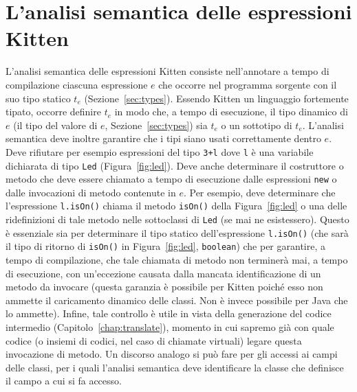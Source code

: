 \section{L'analisi semantica delle espressioni Kitten}
  \label{sec:analysis_expressions}
%
L'analisi semantica delle espressioni Kitten consiste nell'annotare a tempo
di compilazione ciascuna
espressione $e$ che occorre nel programma sorgente con il suo tipo statico
$t_e$ (Sezione~\ref{sec:types}).
Essendo Kitten un linguaggio fortemente tipato, occorre definire
$t_e$ in modo che, a tempo di esecuzione, il tipo dinamico di $e$
(\cioe il tipo del valore di $e$, Sezione~\ref{sec:types})
sia $t_e$ o un sottotipo di $t_e$.
L'analisi semantica deve inoltre garantire che i tipi siano usati correttamente
dentro $e$. Deve rifiutare per esempio espressioni del tipo
\texttt{3+l} dove \texttt{l} \`e una variabile dichiarata di tipo
\texttt{Led} (Figura~\ref{fig:led}). Deve anche determinare il costruttore o 
metodo che deve essere chiamato a tempo di esecuzione dalle espressioni
\texttt{new} o dalle invocazioni di metodo contenute in $e$. Per esempio,
deve determinare che l'espressione \texttt{l.isOn()} chiama il metodo
\texttt{isOn()} della Figura~\ref{fig:led} o una delle ridefinizioni di tale
metodo nelle sottoclassi di \texttt{Led} (se mai ne esistessero). Questo \`e
essenziale sia per determinare il tipo statico dell'espressione
\texttt{l.isOn()} (che sar\`a il tipo di ritorno di \texttt{isOn()} in
Figura~\ref{fig:led}, \cioe \texttt{boolean})
che per garantire, a tempo di compilazione, che tale chiamata di metodo
non terminer\`a mai, a tempo di esecuzione, con un'eccezione causata dalla
mancata identificazione di un metodo da invocare (questa garanzia \`e possibile
per Kitten poich\'e esso non ammette il caricamento dinamico delle classi.
Non \`e invece possibile per Java che lo ammette). Infine, tale
controllo \`e utile in vista della generazione del codice intermedio
(Capitolo~\ref{chap:translate}), momento in cui sapremo gi\`a con quale
codice (o insiemi di codici, nel caso di chiamate virtuali)
legare questa invocazione di metodo.
Un discorso analogo si pu\`o fare per gli accessi ai campi delle classi,
per i quali l'analisi semantica deve identificare la classe che definisce
il campo a cui si fa accesso.

